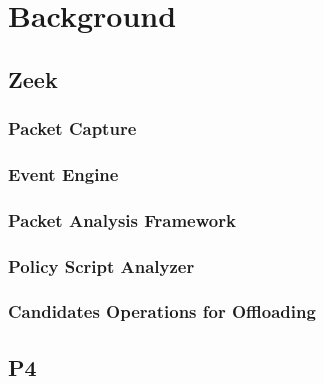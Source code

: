 \chapter{Background}
\label{cap:background}



\section{Zeek}
\label{sec:zeek}

\subsection{Packet Capture}

\subsection{Event Engine}
\label{sec:zeek_ee}

\subsection{Packet Analysis Framework}
\label{sec:packet_analysis_framework}

\subsection{Policy Script Analyzer}
\label{sec:zeek_psi}

\subsection{Candidates Operations for Offloading}
\label{sec:candidate_operations}

\section{P4}
